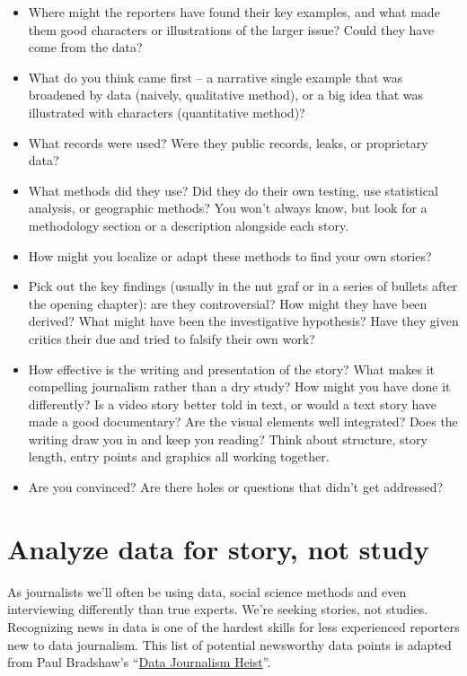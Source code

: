 \documentclass[
  letterpaper,
  DIV=11,
  numbers=noendperiod]{scrreprt}
\begin{document}
\begin{itemize}
\item
  Where might the reporters have found their key examples, and what made
  them good characters or illustrations of the larger issue? Could they
  have come from the data?
\item
  What do you think came first -- a narrative single example that was
  broadened by data (naively, qualitative method), or a big idea that
  was illustrated with characters (quantitative method)?
\item
  What records were used? Were they public records, leaks, or
  proprietary data?
\item
  What methods did they use? Did they do their own testing, use
  statistical analysis, or geographic methods? You won't always know,
  but look for a methodology section or a description alongside each
  story.
\item
  How might you localize or adapt these methods to find your own
  stories?
\item
  Pick out the key findings (usually in the nut graf or in a series of
  bullets after the opening chapter): are they controversial? How might
  they have been derived? What might have been the investigative
  hypothesis? Have they given critics their due and tried to falsify
  their own work?
\item
  How effective is the writing and presentation of the story? What makes
  it compelling journalism rather than a dry study? How might you have
  done it differently? Is a video story better told in text, or would a
  text story have made a good documentary? Are the visual elements well
  integrated? Does the writing draw you in and keep you reading? Think
  about structure, story length, entry points and graphics all working
  together.
\item
  Are you convinced? Are there holes or questions that didn't get
  addressed?
\end{itemize}

\hypertarget{analyze-data-for-story-not-study}{%
\section{Analyze data for story, not
study}\label{analyze-data-for-story-not-study}}

As journalists we'll often be using data, social science methods and
even interviewing differently than true experts. We're seeking stories,
not studies. Recognizing news in data is one of the hardest skills for
less experienced reporters new to data journalism. This list of
potential newsworthy data points is adapted from Paul Bradshaw's
``\href{https://leanpub.com/DataJournalismHeist}{Data Journalism
Heist}''.
\end{document}
